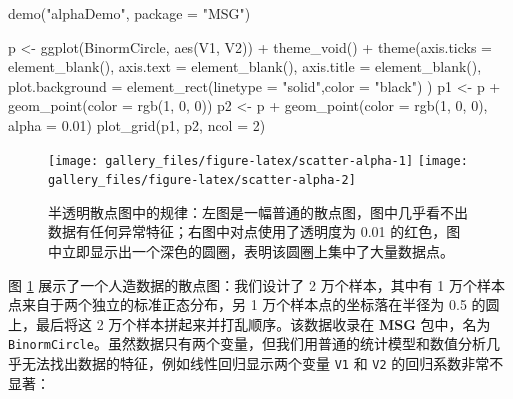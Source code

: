 \documentclass[
  b5paper,
  UTF8,twoside]{book}
\newenvironment{Shaded}{\begin{snugshade}}{\end{snugshade}}
\newcommand{\AttributeTok}[1]{\textcolor[rgb]{0.77,0.63,0.00}{#1}}
\newcommand{\DecValTok}[1]{\textcolor[rgb]{0.00,0.00,0.81}{#1}}
\newcommand{\FloatTok}[1]{\textcolor[rgb]{0.00,0.00,0.81}{#1}}
\newcommand{\FunctionTok}[1]{\textcolor[rgb]{0.00,0.00,0.00}{#1}}
\newcommand{\NormalTok}[1]{#1}
\newcommand{\OtherTok}[1]{\textcolor[rgb]{0.56,0.35,0.01}{#1}}
\newcommand{\SpecialCharTok}[1]{\textcolor[rgb]{0.00,0.00,0.00}{#1}}
\newcommand{\StringTok}[1]{\textcolor[rgb]{0.31,0.60,0.02}{#1}}
\begin{document}
\begin{Shaded}
\begin{Highlighting}[]
\FunctionTok{demo}\NormalTok{(}\StringTok{"alphaDemo"}\NormalTok{, }\AttributeTok{package =} \StringTok{"MSG"}\NormalTok{)}

\NormalTok{p }\OtherTok{\textless{}{-}} \FunctionTok{ggplot}\NormalTok{(BinormCircle, }\FunctionTok{aes}\NormalTok{(V1, V2)) }\SpecialCharTok{+}
  \FunctionTok{theme\_void}\NormalTok{() }\SpecialCharTok{+}
  \FunctionTok{theme}\NormalTok{(}\AttributeTok{axis.ticks =} \FunctionTok{element\_blank}\NormalTok{(), }
    \AttributeTok{axis.text =} \FunctionTok{element\_blank}\NormalTok{(),}
    \AttributeTok{axis.title =} \FunctionTok{element\_blank}\NormalTok{(),}
    \AttributeTok{plot.background =} \FunctionTok{element\_rect}\NormalTok{(}\AttributeTok{linetype =} \StringTok{"solid"}\NormalTok{,}\AttributeTok{color =} \StringTok{"black"}\NormalTok{)}
\NormalTok{  )}
\NormalTok{p1 }\OtherTok{\textless{}{-}}\NormalTok{ p }\SpecialCharTok{+} \FunctionTok{geom\_point}\NormalTok{(}\AttributeTok{color =} \FunctionTok{rgb}\NormalTok{(}\DecValTok{1}\NormalTok{, }\DecValTok{0}\NormalTok{, }\DecValTok{0}\NormalTok{))}
\NormalTok{p2 }\OtherTok{\textless{}{-}}\NormalTok{ p }\SpecialCharTok{+} \FunctionTok{geom\_point}\NormalTok{(}\AttributeTok{color =} \FunctionTok{rgb}\NormalTok{(}\DecValTok{1}\NormalTok{, }\DecValTok{0}\NormalTok{, }\DecValTok{0}\NormalTok{), }\AttributeTok{alpha =} \FloatTok{0.01}\NormalTok{)}
\FunctionTok{plot\_grid}\NormalTok{(p1, p2, }\AttributeTok{ncol =} \DecValTok{2}\NormalTok{)}
\end{Highlighting}
\end{Shaded}

\begin{figure}

{\centering \texttt{[image: gallery\_files/figure-latex/scatter-alpha-1]} \texttt{[image: gallery\_files/figure-latex/scatter-alpha-2]} 

}

\caption[半透明散点图中的规律]{半透明散点图中的规律：左图是一幅普通的散点图，图中几乎看不出数据有任何异常特征；右图中对点使用了透明度为 0.01 的红色，图中立即显示出一个深色的圆圈，表明该圆圈上集中了大量数据点。}\label{fig:scatter-alpha}
\end{figure}

图 \ref{fig:scatter-alpha}
展示了一个人造数据的散点图：我们设计了 2 万个样本，其中有 1 万个样本点来自于两个独立的标准正态分布，另 1 万个样本点的坐标落在半径为 0.5 的圆上，最后将这 2 万个样本拼起来并打乱顺序。该数据收录在 \textbf{MSG} 包中，名为 \texttt{BinormCircle}。虽然数据只有两个变量，但我们用普通的统计模型和数值分析几乎无法找出数据的特征，例如线性回归显示两个变量 \texttt{V1} 和 \texttt{V2} 的回归系数非常不显著：
\end{document}
